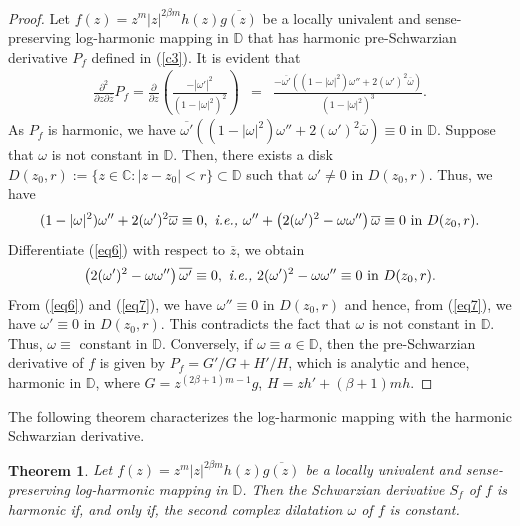 \documentclass[12pt,reqno]{amsart}
\newtheorem{thm}{Theorem}[section]
\newtheorem{open problem}{Open problem}[section]
\newcommand{\ol}{\overline}
\newcommand{\beas}{\begin{eqnarray*}}
\newcommand{\eeas}{\end{eqnarray*}}
\newcommand{\bea}{\begin{eqnarray}}
\newcommand{\eea}{\end{eqnarray}}
\numberwithin{equation}{section}
\begin{document}
\begin{proof}
Let $f(z)=z^m|z|^{2\beta m} h(z)\ol{g(z)}$ be a locally univalent and sense-preserving log-harmonic mapping in $\mathbb{D}$ that has harmonic pre-Schwarzian derivative $P_f$ defined in (\ref{c3}). It is evident that 
\beas\frac{\partial^2 }{\partial z\partial \ol{z}}P_f=\frac{\partial }{\partial z}\left(\frac{-|\omega'|^2}{(1-|\omega|^2)^2}\right)
&=&\frac{-\ol{\omega'}\left((1-|\omega|^2)\omega''+2(\omega')^2\ol{\omega}\right)}{(1-|\omega|^2)^3}.\eeas 
As $P_f$ is harmonic, we have $\ol{\omega'}\left((1-|\omega|^2)\omega''+2(\omega')^2\ol{\omega}\right)\equiv 0$ in $\mathbb{D}$.
Suppose that $\omega$ is not constant in $\mathbb{D}$. Then, there exists a disk $D(z_0, r):=\{z\in\mathbb{C}: |z-z_0|<r\}\subset \mathbb{D}$ such that $\omega'\not=0$ in $D(z_0, r)$. Thus, we have 
\bea\label{eq6} (1-|\omega|^2)\omega''+2(\omega')^2\ol{\omega}\equiv 0,~\text{\it i.e.,}~\omega''+\left(2(\omega')^2-\omega\omega''\right)\ol{\omega}\equiv 0 ~\text{in}~D(z_0,r).\eea
Differentiate (\ref{eq6}) with respect to $\ol{z}$, we obtain
\bea\label{eq7}\left(2(\omega')^2-\omega\omega''\right)\ol{\omega'}\equiv 0,~\text{\it i.e.,}~2(\omega')^2-\omega\omega''\equiv 0 ~\text{in}~D(z_0,r).\eea
From (\ref{eq6}) and (\ref{eq7}), we have $\omega''\equiv 0$ in $D(z_0,r)$ and hence, from (\ref{eq7}), we have $\omega'\equiv 0$ in $D(z_0, r)$. This contradicts the fact that $\omega$ 
is not constant in $\mathbb{D}$. Thus, $\omega\equiv$ constant in $\mathbb{D}$. Conversely, if $\omega\equiv a\in\mathbb{D}$, then the pre-Schwarzian derivative of $f$ is given by $P_f=G'/G+H'/H$, which is analytic and hence, harmonic in $\mathbb{D}$, where $G=z^{(2\beta+1)m-1}g$, $H=zh'+(\beta+1)m h$. 
\end{proof}
The following theorem characterizes the log-harmonic mapping with the harmonic Schwarzian derivative.
\begin{thm}\label{Theo5}
Let $f(z)=z^m|z|^{2\beta m} h(z)\ol{g(z)}$ be a locally univalent and sense-preserving log-harmonic mapping in $\mathbb{D}$. Then the Schwarzian derivative $S_f$ of $f$ is harmonic if, 
and only if, the second complex dilatation $\omega$ of $f$ is constant.
\end{thm}
\end{document}
